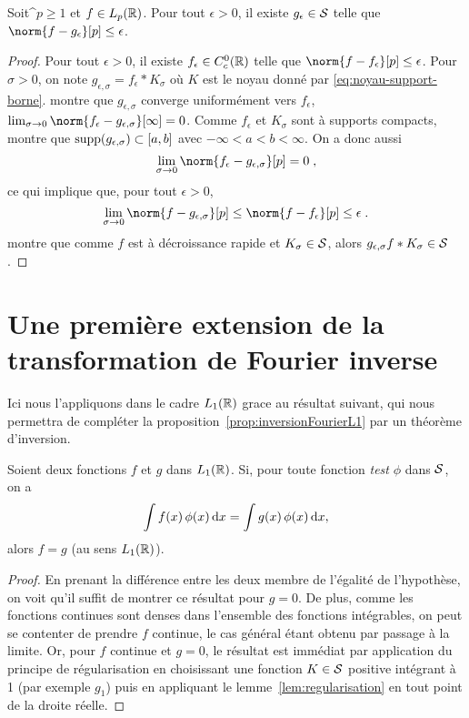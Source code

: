 \begin{theorem}
\label{theo:densite-mcs-Lp}
Soit^$p \geq 1$ et $f \in L_p(\mathbb{R})$. Pour tout $\epsilon > 0$, il existe $g_\epsilon \in \mathcal{S}$ telle que 
$\norm{f - g_\epsilon}[p] \leq \epsilon$.
\end{theorem}
\begin{proof}
Pour tout $\epsilon > 0$, il existe $f_\epsilon \in C_c^0(\mathbb{R})$ telle que $\norm{f - f_\epsilon}[p] \leq \epsilon$.
Pour $\sigma > 0$, on note $g_{\epsilon,\sigma} = f_\epsilon * K_\sigma$ où $K$ est le noyau donn\'e par \eqref{eq:noyau-support-borne}.  montre que $g_{\epsilon,\sigma}$ converge uniformément vers $f_\epsilon$, \ie\ $\lim_{\sigma \to 0} \norm{f_\epsilon - g_{\epsilon,\sigma}}[\infty]= 0$. Comme $f_\epsilon$ et $K_\sigma$ sont à supports compacts,  montre que $\mathrm{supp}(g_{\epsilon,\sigma}) \subset \left[a,b\right]$ avec $-\infty < a < b < \infty$.
On a donc aussi 
$$
\lim_{\sigma \to 0} \norm{f_\epsilon - g_{\epsilon,\sigma}}[p] = 0 \eqsp,
$$
ce qui implique que, pour tout $\epsilon > 0$, 
$$
\lim_{\sigma \to 0} \norm{f - g_{\epsilon,\sigma}}[p] \leq \norm{f-f_\epsilon}[p] \leq \epsilon \eqsp.
$$
 montre que comme $f$ est à décroissance rapide et $K_\sigma \in \mathcal{S}$, alors $g_{\epsilon,\sigma} f * K_\sigma \in \mathcal{S}$.
\end{proof}


\section{Une première extension de la transformation de Fourier inverse}
Ici nous l'appliquons dans le cadre $L_1(\mathbb{R})$ grace au r{\'e}sultat suivant, qui nous permettra de compl{\'e}ter la
proposition~\ref{prop:inversionFourierL1} par un th{\'e}or{\`e}me d'inversion.
\begin{proposition}\label{prop:DualiteSchwartz}
Soient deux fonctions $f$ et $g$ dans $L_1(\mathbb{R})$. Si, pour toute fonction \textit{test} $\phi$ dans $\mathcal{S}$, on a
$$
\int f(x)\,\phi(x)\,\mathrm{d} x= \int g(x)\,\phi(x)\,\mathrm{d} x,
$$
alors $f=g$ (au sens $L_1(\mathbb{R})$).
\end{proposition}
\begin{proof}
En prenant la diff{\'e}rence entre les deux membre de l'{\'e}galit{\'e} de l'hypoth{\`e}se, on voit qu'il suffit de montrer ce r{\'e}sultat pour
$g=0$. De plus, comme les fonctions continues sont denses dans l'ensemble des fonctions int\'egrables, on peut se contenter de prendre $f$ continue, le cas g{\'e}n{\'e}ral {\'e}tant
obtenu par passage {\`a} la limite. Or, pour $f$ continue et $g=0$, le r{\'e}sultat est imm{\'e}diat par application du principe de
r{\'e}gularisation en choisissant une fonction $K\in\mathcal{S}$ positive int{\'e}grant {\`a} 1 (par exemple $g_1$) puis en appliquant le
lemme~\ref{lem:regularisation} en tout point de la droite r{\'e}elle.
\end{proof}

